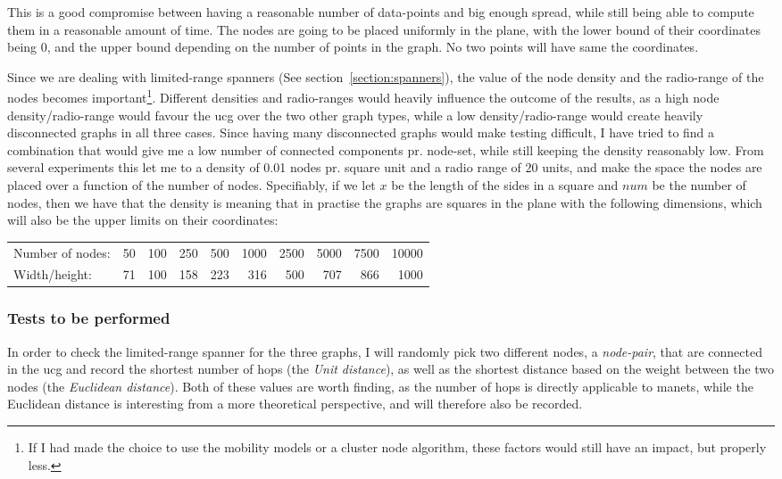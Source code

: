 This is a good compromise between having a reasonable number of data-points and big enough spread, while still being able to compute them in a reasonable amount of time. The nodes are going to be placed uniformly in the plane, with the lower bound of their coordinates being 0, and the upper bound depending on the number of points in the graph. No two points will have same the coordinates. 

Since we are dealing with limited-range spanners (See section~\ref{section:spanners}), the value of the node density and the radio-range of the nodes becomes important\footnote{If I had made the choice to use the mobility models or a cluster node algorithm, these factors would still have an impact, but properly less.}. Different densities and radio-ranges would heavily influence the outcome of the results, as a high node density/radio-range would favour the \ac{ucg} over the two other graph types, while a low density/radio-range would create heavily disconnected graphs in all three cases. Since having many disconnected graphs would make testing difficult, I have tried to find a combination that would give me a low number of connected components pr. node-set, while still keeping the density reasonably low. From several experiments this let me to a density of 0.01 nodes pr. square unit and a radio range of 20 units, and make the space the nodes are placed over a function of the number of nodes. Specifiably, if we let $x$ be the length of the sides in a square and $num$ be the number of nodes, then we have that the density is
meaning that in practise the graphs are squares in the plane with the following dimensions, which will also be the upper limits on their coordinates:\\
{\tiny
\begin{tabular}{lrrrrrrrrr}
Number of nodes: & 50 & 100 & 250 & 500 & 1000 & 2500 & 5000 & 7500 & 10000 \\
Width/height:    & 71 & 100 & 158 & 223 &  316 &  500 &  707 &  866 & 1000 
\end{tabular} 
}

\subsubsection{Tests to be performed}
\label{section:spanner_tests_performed}
In order to check the limited-range spanner for the three graphs, I will randomly pick two different nodes, a \emph{node-pair}, that are connected in the \ac{ucg} and record the shortest number of hops (the \emph{Unit distance}), as well as the shortest distance based on the weight between the two nodes (the \emph{Euclidean distance}). Both of these values are worth finding, as the number of hops is directly applicable to \acp{manet}, while the Euclidean distance is interesting from a more theoretical perspective, and will therefore also be recorded.

